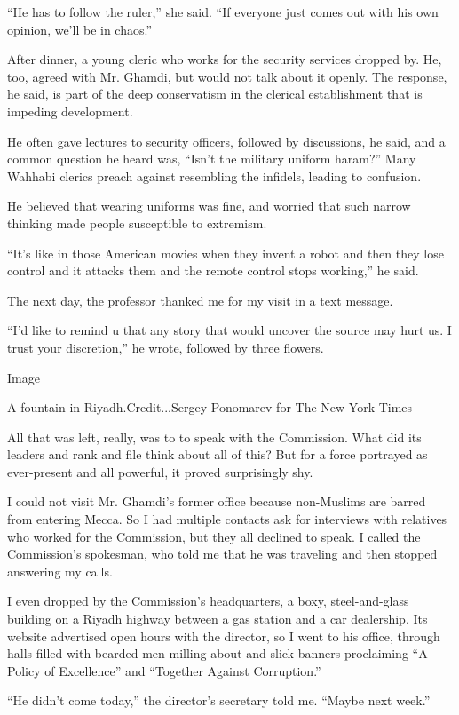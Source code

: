 ``He has to follow the ruler,'' she said. ``If everyone just comes out
with his own opinion, we'll be in chaos.''

After dinner, a young cleric who works for the security services dropped
by. He, too, agreed with Mr. Ghamdi, but would not talk about it openly.
The response, he said, is part of the deep conservatism in the clerical
establishment that is impeding development.

He often gave lectures to security officers, followed by discussions, he
said, and a common question he heard was, ``Isn't the military uniform
haram?'' Many Wahhabi clerics preach against resembling the infidels,
leading to confusion.

He believed that wearing uniforms was fine, and worried that such narrow
thinking made people susceptible to extremism.

``It's like in those American movies when they invent a robot and then
they lose control and it attacks them and the remote control stops
working,'' he said.

The next day, the professor thanked me for my visit in a text message.

``I'd like to remind u that any story that would uncover the source may
hurt us. I trust your discretion,'' he wrote, followed by three flowers.

Image

A fountain in Riyadh.Credit...Sergey Ponomarev for The New York Times

All that was left, really, was to to speak with the Commission. What did
its leaders and rank and file think about all of this? But for a force
portrayed as ever-present and all powerful, it proved surprisingly shy.

I could not visit Mr. Ghamdi's former office because non-Muslims are
barred from entering Mecca. So I had multiple contacts ask for
interviews with relatives who worked for the Commission, but they all
declined to speak. I called the Commission's spokesman, who told me that
he was traveling and then stopped answering my calls.

I even dropped by the Commission's headquarters, a boxy, steel-and-glass
building on a Riyadh highway between a gas station and a car dealership.
Its website advertised open hours with the director, so I went to his
office, through halls filled with bearded men milling about and slick
banners proclaiming ``A Policy of Excellence'' and ``Together Against
Corruption.''

``He didn't come today,'' the director's secretary told me. ``Maybe next
week.''

